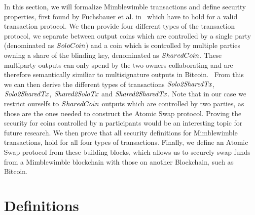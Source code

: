 In this section, we will formalize Mimblewimble transactions and define security properties, first found by Fuchsbauer et al. in~\cite{fuchsbauer2019aggregate} which have to hold for a valid transaction protocol.
We then provide four different types of the transaction protocol, we separate between output coins which are controlled by a single party (denominated as $SoloCoin$) and a coin which is controlled by multiple parties owning a share of the blinding key, denominated as $SharedCoin$. These multiparty outputs can only spend by the two owners collaborating and are therefore semantically similiar to multisignature outputs in Bitcoin.~\cite{bistarelli2018analysis}
From this we can then derive the different types of transactions $\mathit{Solo2SharedTx}$, $\mathit{Solo2SharedTx}$, $\mathit{Shared2SoloTx}$ and $\mathit{Shared2SharedTx}$. Note that in our case we restrict ourselfs to $SharedCoin$ outputs which are controlled by two parties, as those are the ones needed to construct the Atomic Swap protocol.
Proving the security for coins controlled by n participants would be an interesting topic for future research.
We then prove that all security definitions for Mimblewimble transactions, hold for all four types of transactions.
Finally, we define an Atomic Swap protocol from these building blocks, which allows us to securely swap funds from a Mimblewimble blockchain with those on another Blockchain, such as Bitcoin.

\section{Definitions}\label{sec:atomic-def}

